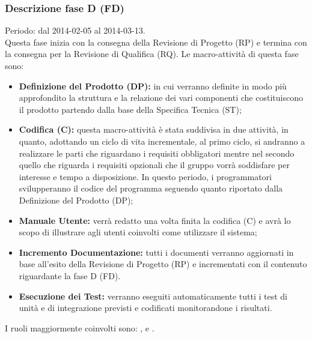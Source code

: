 \subsubsection{Descrizione fase D (FD)}
\label{Progettazione di Dettaglio e Codifica (FPDC)}
Periodo: dal 2014-02-05 al 2014-03-13.\\
Questa fase inizia con la consegna della Revisione di Progetto (RP) e termina con la consegna per la Revisione di Qualifica (RQ). 
Le macro-attività di questa fase sono:
\begin{itemize}
\item \textbf{Definizione del Prodotto (DP):} in cui verranno definite in modo più approfondito la struttura e la relazione dei vari componenti che costituiscono il prodotto partendo dalla base della Specifica Tecnica (ST);
\item \textbf{Codifica (C):} questa macro-attività è stata suddivisa in due attività, in quanto, adottando un ciclo di vita incrementale, al primo ciclo, si andranno a realizzare le parti che riguardano i requisiti obbligatori mentre nel secondo quello che riguarda i requisiti opzionali che il gruppo \authorName{} vorrà soddisfare per interesse e tempo a disposizione. In questo periodo, i programmatori svilupperanno il codice del programma seguendo quanto riportato dalla Definizione del Prodotto (DP);
\item \textbf{Manuale Utente:} verrà redatto una volta finita la codifica (C) e avrà lo scopo di illustrare agli utenti coinvolti come utilizzare il sistema;
\item \textbf{Incremento Documentazione:} tutti i documenti verranno aggiornati in base all'esito della Revisione di Progetto (RP) e incrementati con il contenuto riguardante la fase D (FD).
\item \textbf{Esecuzione dei Test:} verranno eseguiti automaticamente tutti i test di unità e di integrazione previsti e codificati monitorandone i risultati.
\end{itemize}
I ruoli maggiormente coinvolti sono: \designer , \verifier{} e \programmer.
